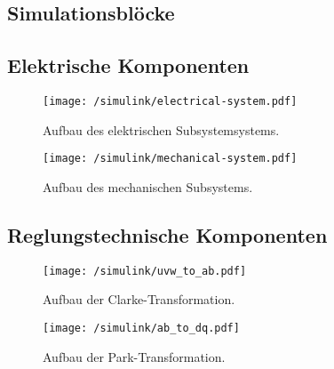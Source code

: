 \begin{appendix}
\chapter{Simulationsblöcke}
\section{Elektrische Komponenten}
\begin{figure}[htb]
	\centering
	\texttt{[image: /simulink/electrical-system.pdf]}
	\label{fig:electrical-system}
	\caption{Aufbau des elektrischen Subsystemsystems.}
\end{figure}

\begin{figure}[htb]
\centering
\texttt{[image: /simulink/mechanical-system.pdf]}
\label{fig:mechanical-system}
\caption{Aufbau des mechanischen Subsystems.}
\end{figure}
\newpage
\section{Reglungstechnische Komponenten}
\begin{figure}[h]
	\centering
	\texttt{[image: /simulink/uvw\_to\_ab.pdf]}
	\label{fig:uvw_to_ab}
	\caption{Aufbau der Clarke-Transformation.}
\end{figure}

\begin{figure}[h]
	\centering
	\texttt{[image: /simulink/ab\_to\_dq.pdf]}
	\label{fig:uvw_to_ab}
	\caption{Aufbau der Park-Transformation.}
\end{figure}

	
	
\end{appendix}

